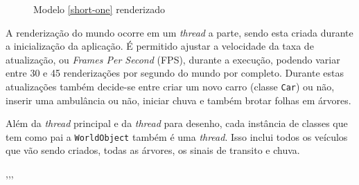 \begin{figure}[ht!]
  \centering
  \caption{Modelo \ref{short-one} renderizado}
\end{figure}


A renderização do mundo ocorre em um \textit{thread} a parte, sendo
esta criada durante a inicialização da aplicação. É permitido ajustar
a velocidade da taxa de atualização, ou \textit{Frames Per Second} (FPS),
durante a execução, podendo variar entre 30 e 45 renderizações por
segundo do mundo por completo. Durante estas atualizações também
decide-se entre criar um novo carro (classe \verb!Car!) ou não,
inserir uma ambulância ou não, iniciar chuva e também brotar folhas em
árvores.

Além da \textit{thread} principal e da \textit{thread} para desenho,
cada instância de classes que tem como pai a \verb!WorldObject! também
é uma \textit{thread}. Isso inclui todos os veículos que vão sendo
criados, todas as árvores, os sinais de transito e chuva.

,,,
